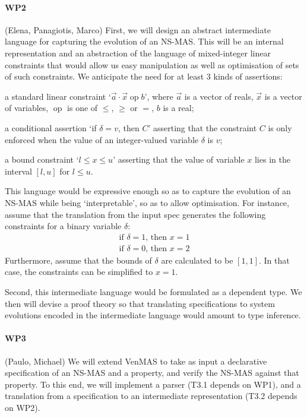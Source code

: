 \documentclass[11pt]{article}
\newcommand{\op}{\mathop{\text{op}}}
\begin{document}
\paragraph{WP2} (Elena, Panagiotis, Marco) First, we will design an
abstract intermediate language for capturing the evolution of an
NS-MAS. This will be an internal representation and an abstraction of
the language of mixed-integer linear constraints that would allow us
easy manipulation as well as optimisation of sets of such
constraints. We anticipate the need for at least 3 kinds of
assertions:
\begin{inparaenum}[\it (i)]
\item a standard linear constraint `$\vec{a} \cdot \vec{x} \op b$',
  where $\vec{a}$ is a vector of reals, $\vec{x}$ is a vector of
  variables, $\op$ is one of $\leq$, $\geq$ or $=$, $b$ is a real;
\item a conditional assertion `if $\delta = v$, then $C$' asserting
  that the constraint $C$ is only enforced when the value of an
  integer-valued variable $\delta$ is $v$;
\item a bound constraint `$l \leq x \leq u$' asserting that the value
  of variable $x$ lies in the interval $[l,u]$ for $l\leq u$.
\end{inparaenum}
This language would be expressive enough so as to capture the
evolution of an NS-MAS while being `interpretable', so as to allow
optimisation.  For instance, assume that the translation from the
input spec generates the following constraints for a binary variable
$\delta$:
\[
  \begin{array}{l}
    \text{if }\delta = 1\text{, then }x = 1\\
    \text{if }\delta = 0\text{, then }x = 2
  \end{array}
\]
Furthermore, assume that the bounds of $\delta$ are calculated to be
$[1,1]$. In that case, the constraints can be simplified to $x=1$.

Second, this intermediate language would be formulated as a dependent
type. We then will devise a proof theory so that translating
specifications to system evolutions encoded in the intermediate
language would amount to type inference.

\paragraph{WP3} (Paulo, Michael) We will extend VenMAS to take as
input a declarative specification of an NS-MAS and a property, and
verify the NS-MAS against that property. To this end, we will
implement a parser (T3.1 depends on WP1), and a translation from a
specification to an intermediate representation (T3.2 depends on WP2).
\end{document}
